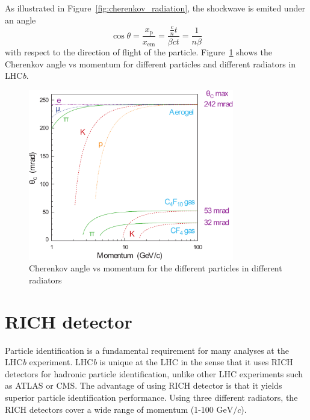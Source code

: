 \documentclass[11pt]{scrreprt}
\begin{document}
As illustrated in Figure~\ref{fig:cherenkov_radiation}, the shockwave is emited under an angle
\begin{equation}
    \cos\theta = \frac{x_{\text{p}}}{x_{\text{em}}} = \frac{\frac{c}{n}t}{\beta c t} = \frac{1}{n\beta}
\end{equation}
with respect to the direction of flight of the particle. Figure~\ref{fig:radiators} shows the Cherenkov angle vs momentum for different particles and different radiators in LHC\textit{b}.

\begin{figure}[tb]
  \centering
  \includegraphics[width=0.8\textwidth]{pics/radiators}
  \caption{Cherenkov angle vs momentum for the different particles in different radiators}
  \label{fig:radiators}
\end{figure}

\section{RICH detector} %
\label{sec:rich_detector}

Particle identification is a fundamental requirement for many analyses at the LHC\textit{b} experiment. LHC\textit{b} is 
unique at the LHC in the sense that it uses RICH detectors for hadronic particle identification, unlike other LHC experiments such as ATLAS or CMS. The advantage of using RICH detector is that it yields superior particle identification performance. Using three different radiators, the RICH detectors cover a wide range of momentum (1-100 $\text{GeV}/c$).
\end{document}
